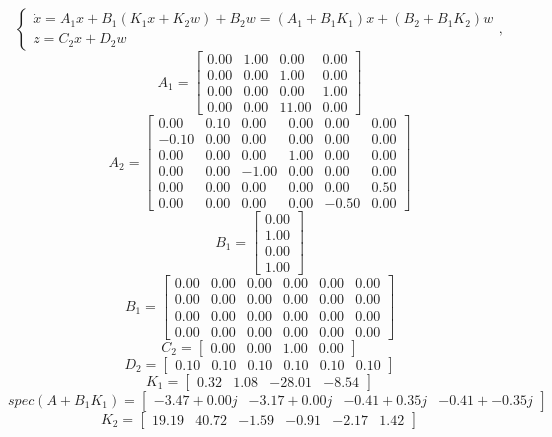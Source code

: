 \[
    \begin{cases}
        \dot{x} = A_1x + B_1 (K_1x + K_2w) + B_2w = (A_1 + B_1 K_1) x + (B_2 + B_1 K_2)w \\
        z = C_2x + D_2 w
    \end{cases},
\]
\[A_1 = \begin{bmatrix}
  0.00 &  1.00 &  0.00 &  0.00\\
  0.00 &  0.00 &  1.00 &  0.00\\
  0.00 &  0.00 &  0.00 &  1.00\\
  0.00 &  0.00 &  11.00 &  0.00
\end{bmatrix}\]
\[A_2 = \begin{bmatrix}
  0.00 &  0.10 &  0.00 &  0.00 &  0.00 &  0.00\\
 -0.10 &  0.00 &  0.00 &  0.00 &  0.00 &  0.00\\
  0.00 &  0.00 &  0.00 &  1.00 &  0.00 &  0.00\\
  0.00 &  0.00 & -1.00 &  0.00 &  0.00 &  0.00\\
  0.00 &  0.00 &  0.00 &  0.00 &  0.00 &  0.50\\
  0.00 &  0.00 &  0.00 &  0.00 & -0.50 &  0.00
\end{bmatrix}\]
\[B_1 = \begin{bmatrix}
  0.00\\
  1.00\\
  0.00\\
  1.00
\end{bmatrix}\]
\[B_1 = \begin{bmatrix}
  0.00 &  0.00 &  0.00 &  0.00 &  0.00 &  0.00\\
  0.00 &  0.00 &  0.00 &  0.00 &  0.00 &  0.00\\
  0.00 &  0.00 &  0.00 &  0.00 &  0.00 &  0.00\\
  0.00 &  0.00 &  0.00 &  0.00 &  0.00 &  0.00
\end{bmatrix}\]
\[C_2 = \begin{bmatrix}
  0.00 &  0.00 &  1.00 &  0.00
\end{bmatrix}\]
\[D_2 = \begin{bmatrix}
  0.10 &  0.10 &  0.10 &  0.10 &  0.10 &  0.10
\end{bmatrix}\]
\[K_1 = \begin{bmatrix}
  0.32 &  1.08 & -28.01 & -8.54
\end{bmatrix}\]
\[spec(A + B_1 K_1) = \begin{bmatrix}
 -3.47 + 0.00j & -3.17 + 0.00j & -0.41 + 0.35j & -0.41 + -0.35j
\end{bmatrix}\]
\[K_2 = \begin{bmatrix}
  19.19 &  40.72 & -1.59 & -0.91 & -2.17 &  1.42
\end{bmatrix}\]


